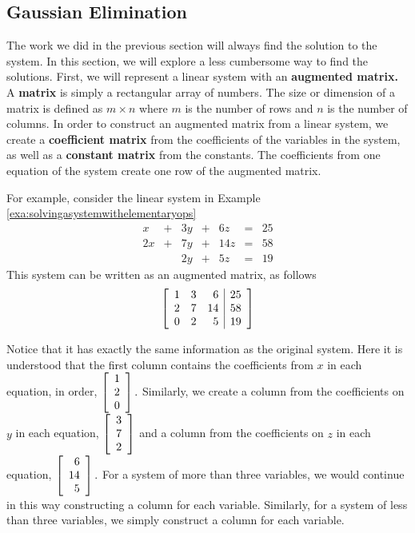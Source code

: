 \subsection{Gaussian Elimination}

The work we did in the previous section will always find the solution to the system. In this section, we will explore a less cumbersome way to 
find the solutions. First, we will represent a linear system with an \textbf{augmented matrix.} 
A \textbf{matrix}  is simply a rectangular array of numbers. The size or dimension of a matrix  is defined as $m\times n$ where $m$ is the
number of rows and $n$ is the number of columns. In order to construct an augmented matrix
from a linear system, we create a \textbf{coefficient matrix} from the coefficients of the variables in the system, as well as a
\textbf{constant matrix} from the constants. The coefficients from one equation of the system create one row of the augmented matrix. 

For example, consider the linear system in Example \ref{exa:solvingasystemwithelementaryops}
\begin{equation*}
\begin{array}{ccccccc}
x&+&3y&+&6z&=&25 \\
2x&+&7y&+&14z&=&58 \\
&&2y&+&5z&=&19
\end{array}
\end{equation*}
This system can be written as an augmented matrix, as follows \:
\begin{equation*}
\left[ 
\begin{array}{rrr|r}
1 & 3 & 6 & 25 \\
2 & 7 & 14 & 58 \\
0 & 2 & 5 & 19
\end{array}
\right] 
\end{equation*}

Notice that it has exactly the same information as the original system. Here it is
understood that the first column contains the coefficients from $x$ in each equation, in order,   
$\left[
\begin{array}{r}
1 \\
2 \\
0
\end{array}
\right] .$ Similarly, we create a column from the coefficients on $y$ in each equation, $\left[
\begin{array}{r}
3 \\
7 \\
2
\end{array}
\right] $ and a column from the coefficients on $z$ in each equation, $\left[
\begin{array}{r}
6 \\
14 \\
5
\end{array}
\right] .$ For a system of more than three variables, we would continue in this way constructing a column for each variable.
Similarly, for a system of less than three variables, we simply construct a column for each variable. 

